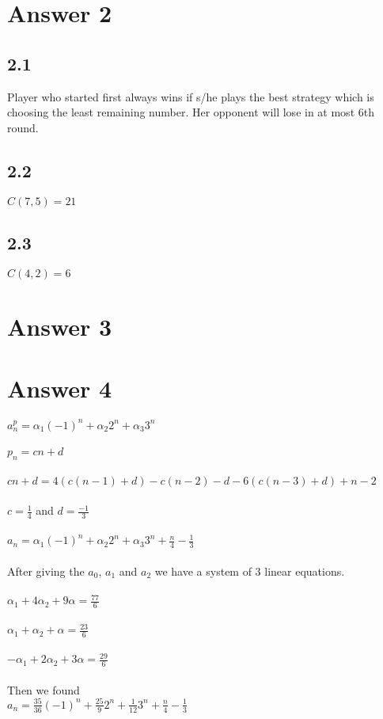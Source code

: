 \documentclass[12pt]{article}
\begin{document}
\section*{Answer 2}
\subsection*{2.1}
Player who started first always wins if s/he plays the best strategy which is choosing the least remaining number. Her opponent will lose in at most 6th round.
\subsection*{2.2}
$C(7,5)=21$
\subsection*{2.3}
$C(4,2)=6$
\section*{Answer 3}


\section*{Answer 4}
$a_{n}^{p} = \alpha_1 (-1)^n + \alpha_2 2^n + \alpha_3 3^n$ \\ \\
$p_n = cn+d$ \\ \\
$cn+d = 4 (c(n-1)+d) - c(n-2) - d -6(c(n-3)+d) + n -2$ \\ \\
$c= \frac{1}{4}$ and $d= \frac{-1}{3}$ \\ \\
$a_n= \alpha_1 (-1)^n + \alpha_2 2^n + \alpha_3 3^n + \frac{n}{4} - \frac{1}{3}$\\  \\
After giving the $a_0$, $a_1$ and $a_2$ we have a system of 3 linear equations. \\ \\
$\alpha_1  +4 \alpha_2 +9 \alpha =\frac{77}{6}$ \\ \\
$\alpha_1  + \alpha_2 + \alpha =\frac{23}{6}$ \\ \\
$- \alpha_1  +2 \alpha_2 +3 \alpha =\frac{29}{6}$ \\ \\
Then we found \\
$a_n= \frac{35}{36} (-1)^n + \frac{25}{9} 2^n + \frac{1}{12} 3^n + \frac{n}{4} - \frac{1}{3}$
\end{document}
